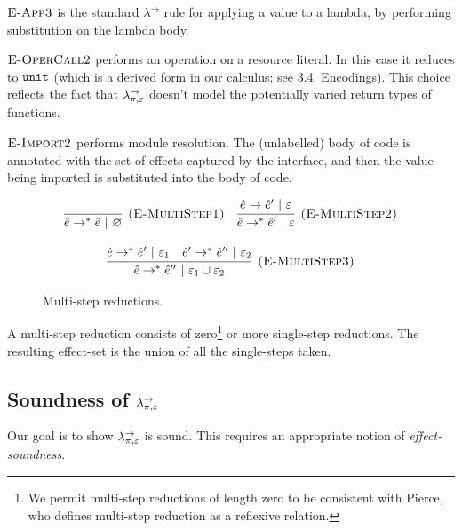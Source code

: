 $\textsc{E-App3}$ is the standard $\lambda^{\rightarrow}$ rule for applying a value to a lambda, by performing substitution on the lambda body.

$\textsc{E-OperCall2}$ performs an operation on a resource literal. In this case it reduces to $\mathtt{unit}$ (which is a derived form in our calculus; see 3.4. Encodings). This choice reflects the fact that $\lambda^{\rightarrow}_{\pi, \varepsilon}$ doesn't model the potentially varied return types of functions. 

$\textsc{E-Import2}$ performs module resolution. The (unlabelled) body of code is annotated with the set of effects captured by the interface, and then the value being imported is substituted into the body of code.


\begin{figure}[h]

\noindent
{}

\[
\begin{array}{c}

\infer[\textsc{(E-MultiStep1)}]
	{\hat e \rightarrow^{*} \hat e~|~\varnothing}
	{}
~~~
\infer[\textsc{(E-MultiStep2)}]
	{\hat e \rightarrow^{*} \hat e'~|~\varepsilon}
	{\hat e \rightarrow \hat e'~|~\varepsilon} \\[3ex]
	
\infer[\textsc{(E-MultiStep3)}]
	{\hat e \rightarrow^{*} \hat e''~|~\varepsilon_1 \cup \varepsilon_2}
	{\hat e \rightarrow^{*} \hat e'~|~\varepsilon_1 & \hat e' \rightarrow^{*} \hat e''~|~\varepsilon_2}
\end{array}
\]

\vspace{-7pt}
\caption{Multi-step reductions.}
\label{This is the label.}
\end{figure}

\noindent
A multi-step reduction consists of zero\footnote{We permit multi-step reductions of length zero to be consistent with Pierce, who defines multi-step reduction as a reflexive relation\cite[p. 39]{tapl}.} or more single-step reductions. The resulting effect-set is the union of all the single-steps taken.

\subsection{Soundness of $\lambda^{\rightarrow}_{\pi, \varepsilon}$}

\noindent
Our goal is to show $\lambda^{\rightarrow}_{\pi, \varepsilon}$ is sound. This requires an appropriate notion of \textit{effect-soundness}.

